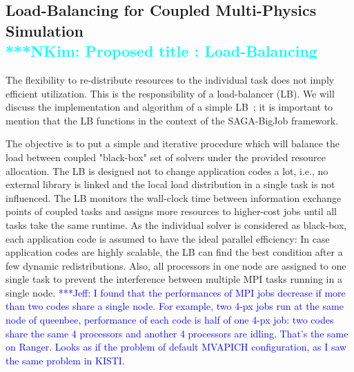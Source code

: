 \documentclass[preprint,12pt]{elsarticle}
\newcommand{\Nkimnote}[1]{ {\textcolor{cyan} { ***NKim: #1 }}}
\newcommand{\skonote}[1]{ {\textcolor{blue} { ***Jeff: #1 }}}
\newcommand{\Nkimnote}[1]{}
\newcommand{\skonote}[1]{}
\begin{document}
\subsection{Load-Balancing for Coupled Multi-Physics Simulation
\\
\Nkimnote{Proposed title : Load-Balancing}}
The flexibility to re-distribute resources to the individual task does not imply efficient utilization. This is the responsibility of a load-balancer (LB). We will discuss the implementation and algorithm of a simple LB~\cite{Ko}; it is important to mention that the LB functions in the context of the SAGA-BigJob framework.

The objective is to put a simple and iterative procedure 
which will balance the load between coupled "black-box" set of solvers under the provided resource allocation.
The LB is designed not to change application codes a lot, i.e., no external library is linked and the local load distribution in a single task is not influenced. The LB monitors the wall-clock time between information exchange points of coupled tasks and assigns more resources to higher-cost jobs until all tasks take the same runtime. As the individual solver is considered as black-box, each application code is assumed to have the ideal parallel efficiency: In case application codes are highly scalable, the LB can find the best condition after a few dynamic redistributions. Also, all processors in one node are assigned to one single task to prevent the interference between multiple MPI tasks running in a single node.\skonote{I found that the performances of MPI jobs decrease if more than two codes share a single node. For example, two 4-px jobs run at the same node of queenbee, performance of each code is half of one 4-px job: two codes share the same 4 processors and another 4 processors are idling. That's the same on Ranger. Looks as if the problem of default MVAPICH configuration, as I saw the same problem in KISTI.}

\end{document}
